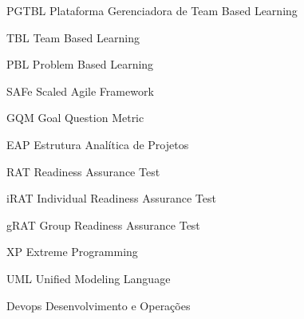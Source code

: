 \begin{siglas}
  \item[PGTBL] Plataforma Gerenciadora de Team Based Learning
  \item[TBL] Team Based Learning
  \item[PBL] Problem Based Learning
  \item[SAFe] Scaled Agile Framework
  \item[GQM] Goal Question Metric
  \item[EAP] Estrutura Analítica de Projetos
  \item[RAT] Readiness Assurance Test
  \item[iRAT] Individual Readiness Assurance Test
  \item[gRAT] Group Readiness Assurance Test
  \item[XP] Extreme Programming
  \item[UML] Unified Modeling Language
  \item[Devops] Desenvolvimento e Operações
\end{siglas}
